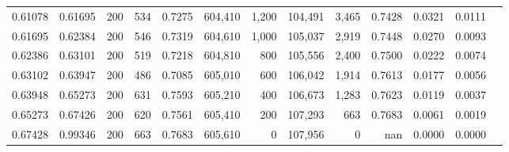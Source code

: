 \begin{tabular}{rrrrrrrrrrrrr}
0.61078 & 0.61695 &    200 & 534 &                                     0.7275 & 604,410 &   1,200 & 104,491 &   3,465 & 0.7428 & 0.0321 & 0.0111 \\
0.61695 & 0.62384 &    200 & 546 &                                     0.7319 & 604,610 &   1,000 & 105,037 &   2,919 & 0.7448 & 0.0270 & 0.0093 \\
0.62386 & 0.63101 &    200 & 519 &                                     0.7218 & 604,810 &     800 & 105,556 &   2,400 & 0.7500 & 0.0222 & 0.0074 \\
0.63102 & 0.63947 &    200 & 486 &                                     0.7085 & 605,010 &     600 & 106,042 &   1,914 & 0.7613 & 0.0177 & 0.0056 \\
0.63948 & 0.65273 &    200 & 631 &                                     0.7593 & 605,210 &     400 & 106,673 &   1,283 & 0.7623 & 0.0119 & 0.0037 \\
0.65273 & 0.67426 &    200 & 620 &                                     0.7561 & 605,410 &     200 & 107,293 &     663 & 0.7683 & 0.0061 & 0.0019 \\
0.67428 & 0.99346 &    200 & 663 &                                     0.7683 & 605,610 &       0 & 107,956 &       0 &    nan & 0.0000 & 0.0000 \\
\bottomrule
\end{tabular}
